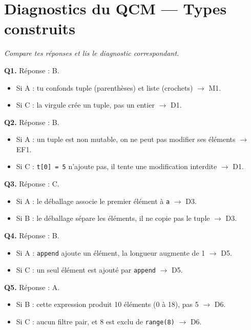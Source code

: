 \section*{Diagnostics du QCM --- Types construits}
\textit{Compare tes réponses et lis le diagnostic correspondant.}

\bigskip

\textbf{Q1.} Réponse : B.
\begin{itemize}[nosep]
  \item Si A : tu confonds tuple (parenthèses) et liste (crochets) $\to$ M1.
  \item Si C : la virgule crée un tuple, pas un entier $\to$ D1.
\end{itemize}

\textbf{Q2.} Réponse : B.
\begin{itemize}[nosep]
  \item Si A : un tuple est non mutable, on ne peut pas modifier ses éléments $\to$ EF1.
  \item Si C : \lstinline{t[0] = 5} n'ajoute pas, il tente une modification interdite $\to$ D1.
\end{itemize}

\textbf{Q3.} Réponse : C.
\begin{itemize}[nosep]
  \item Si A : le déballage associe le premier élément à \lstinline{a} $\to$ D3.
  \item Si B : le déballage sépare les éléments, il ne copie pas le tuple $\to$ D3.
\end{itemize}

\textbf{Q4.} Réponse : B.
\begin{itemize}[nosep]
  \item Si A : \lstinline{append} ajoute un élément, la longueur augmente de 1 $\to$ D5.
  \item Si C : un seul élément est ajouté par \lstinline{append} $\to$ D5.
\end{itemize}

\textbf{Q5.} Réponse : A.
\begin{itemize}[nosep]
  \item Si B : cette expression produit 10 éléments (0 à 18), pas 5 $\to$ D6.
  \item Si C : aucun filtre pair, et 8 est exclu de \lstinline{range(8)} $\to$ D6.
\end{itemize}

